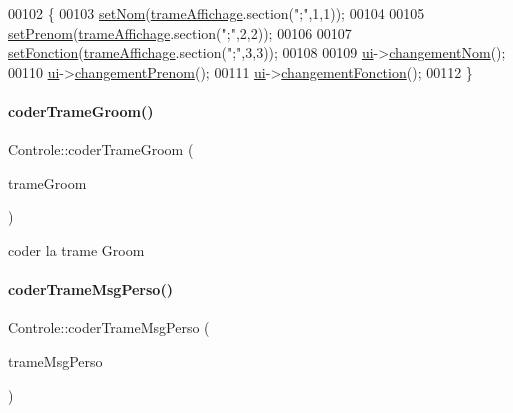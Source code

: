 \begin{DoxyCode}
00102 \{
00103     \hyperlink{class_controle_a0f731cdb733053f7be24e7042611601c}{setNom}(\hyperlink{class_controle_a0bbdd7a0c44fbbc45bf3a381872fcfbe}{trameAffichage}.section(\textcolor{stringliteral}{";"},1,1));
00104 
00105     \hyperlink{class_controle_ab046adc050872b4034c1500eb2e1b728}{setPrenom}(\hyperlink{class_controle_a0bbdd7a0c44fbbc45bf3a381872fcfbe}{trameAffichage}.section(\textcolor{stringliteral}{";"},2,2));
00106 
00107     \hyperlink{class_controle_abe472f4fd197c0fc679539e0b75a6e15}{setFonction}(\hyperlink{class_controle_a0bbdd7a0c44fbbc45bf3a381872fcfbe}{trameAffichage}.section(\textcolor{stringliteral}{";"},3,3));
00108 
00109     \hyperlink{class_controle_a2dd60c955396dd80426c1a74f56ea611}{ui}->\hyperlink{class_ihm_groom_aa270d1fb6a7a9c1385c4ae3e67451ea0}{changementNom}();
00110     \hyperlink{class_controle_a2dd60c955396dd80426c1a74f56ea611}{ui}->\hyperlink{class_ihm_groom_a2e8db190224f15326552a5bd642a9347}{changementPrenom}();
00111     \hyperlink{class_controle_a2dd60c955396dd80426c1a74f56ea611}{ui}->\hyperlink{class_ihm_groom_afc6c48489b270b22a660e32668d6b2ca}{changementFonction}();
00112 \}
\end{DoxyCode}
\mbox{\label{class_controle_a9ba8efd42493ffd4288537a1ace4e220}} 
\paragraph{\texorpdfstring{coder\+Trame\+Groom()}{coderTrameGroom()}}
{\footnotesize\ttfamily Controle\+::coder\+Trame\+Groom (\begin{DoxyParamCaption}\item[{Q\+String}]{trame\+Groom }\end{DoxyParamCaption})\hspace{0.3cm}{\ttfamily [private]}}



coder la trame Groom 

\mbox{\label{class_controle_a77d635484c2e6fca851d40e76f422fce}} 
\paragraph{\texorpdfstring{coder\+Trame\+Msg\+Perso()}{coderTrameMsgPerso()}}
{\footnotesize\ttfamily Controle\+::coder\+Trame\+Msg\+Perso (\begin{DoxyParamCaption}\item[{Q\+String}]{trame\+Msg\+Perso }\end{DoxyParamCaption})\hspace{0.3cm}{\ttfamily [private]}}



